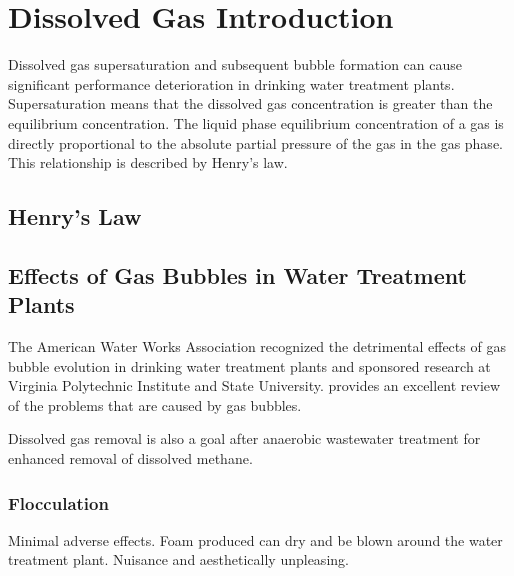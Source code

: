 \documentclass[letterpaper,10pt,english]{sphinxmanual}
\begin{document}
\chapter{Dissolved Gas Introduction}
\label{\detokenize{Dissolved_Gas/DG_Intro:dissolved-gas-introduction}}\label{\detokenize{Dissolved_Gas/DG_Intro:title-dissolved-gas-introduction}}\label{\detokenize{Dissolved_Gas/DG_Intro::doc}}
Dissolved gas supersaturation and subsequent bubble formation can cause significant performance deterioration in drinking water treatment plants. Supersaturation means that the dissolved gas concentration is greater than the equilibrium concentration. The liquid phase equilibrium concentration of a gas is directly proportional to the absolute partial pressure of the gas in the gas phase. This relationship is described by Henry’s law.


\section{Henry’s Law}
\label{\detokenize{Dissolved_Gas/DG_Intro:henry-s-law}}\label{\detokenize{Dissolved_Gas/DG_Intro:heading-henrys-law}}

\section{Effects of Gas Bubbles in Water Treatment Plants}
\label{\detokenize{Dissolved_Gas/DG_Intro:effects-of-gas-bubbles-in-water-treatment-plants}}\label{\detokenize{Dissolved_Gas/DG_Intro:heading-effects-of-gas-bubbles-in-water-treatment-plants}}
The American Water Works Association recognized the detrimental effects of gas bubble evolution in drinking water treatment plants and sponsored research at Virginia Polytechnic Institute and State University.  provides an excellent review of the problems that are caused by gas bubbles.

Dissolved gas removal is also a goal after anaerobic wastewater treatment for enhanced removal of dissolved methane.


\subsection{Flocculation}
\label{\detokenize{Dissolved_Gas/DG_Intro:flocculation}}\label{\detokenize{Dissolved_Gas/DG_Intro:heading-dg-flocculation}}
Minimal adverse effects. Foam produced can dry and be blown around the water treatment plant. Nuisance and aesthetically unpleasing.
\end{document}

